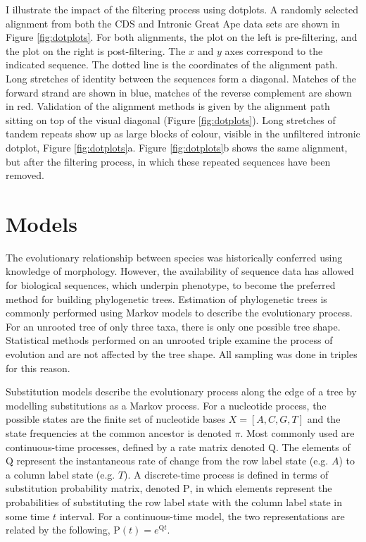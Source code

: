 I illustrate the impact of the filtering process using dotplots.  A randomly selected alignment from both the CDS and Intronic Great Ape data sets are shown in Figure \ref{fig:dotplots}. For both alignments, the plot on the left is pre-filtering, and the plot on the right is post-filtering. The $x$ and $y$ axes correspond to the indicated sequence. The dotted line is the coordinates of the alignment path. Long stretches of identity between the sequences form a diagonal. Matches of the forward strand are shown in blue, matches of the reverse complement are shown in red. Validation of the alignment methods is given by the alignment path sitting on top of the visual diagonal (Figure \ref{fig:dotplots}). Long stretches of tandem repeats show up as large blocks of colour, visible in the unfiltered intronic dotplot, Figure \ref{fig:dotplots}a. Figure \ref{fig:dotplots}b shows the same alignment, but after the filtering process, in which these repeated sequences have been removed.



\section{Models}

The evolutionary relationship between species was historically conferred using knowledge of morphology. However, the availability of sequence data has allowed for biological sequences, which underpin phenotype, to become the preferred method for building phylogenetic trees. Estimation of phylogenetic trees is commonly performed using Markov models to describe the evolutionary process. For an unrooted tree of only three taxa, there is only one possible tree shape. Statistical methods performed on an unrooted triple examine the process of evolution and are not affected by the tree shape. All sampling was done in triples for this reason.

Substitution models describe the evolutionary process along the edge of a tree by modelling substitutions as a Markov process. For a nucleotide process, the possible states are the finite set of nucleotide bases $X = [A, C, G, T]$ and the state frequencies at the common ancestor is denoted $\pi$. Most commonly used are continuous-time processes, defined by a rate matrix denoted $\mathrm{Q}$. The elements of $\mathrm{Q}$ represent the instantaneous rate of change from the row label state (e.g. $A$) to a column label state (e.g. $T$). A discrete-time process is defined in terms of substitution probability matrix, denoted $\mathrm{P}$, in which elements represent the probabilities of substituting the row label state with the column label state in some time $t$ interval. For a continuous-time model, the two representations are related by the following, $\mathrm{P}(t) = e^{\mathrm{Q}t}$. 

